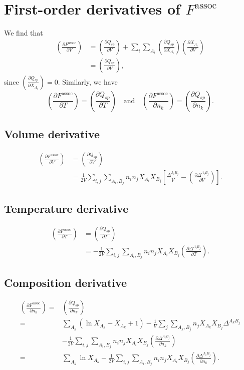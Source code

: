 \documentclass[10pt, a4paper]{article}
\newcommand*{\pder}[2]{\left(\frac{\partial #1}{\partial #2}\right)}
\newcommand{\lp}{\left(}
\newcommand{\rp}{\right)}
\begin{document}
\section{First-order derivatives of $F^{\text{assoc}}$} \label{first-order derivatives}
We find that
\begin{align*}
\pder{F^{\text{assoc}}}{V} &= \pder{Q_{sp}}{V}  + \sum_i \sum_{A_i} \pder{Q_{sp}}{X_{A_i}} \pder{X_{A_i}}{V} \\
& = \pder{Q_{sp}}{V},
\end{align*}
since $\pder{Q_{sp}}{X_{A_i}} = 0$. Similarly, we have
$$
\pder{F^{\text{assoc}}}{T} = \pder{Q_{sp}}{T} \quad \text{and} \quad \pder{F^{\text{assoc}}}{n_k} = \pder{Q_{sp}}{n_k}.
$$
\subsection{Volume derivative}
\begin{align}
  \pder{F^{\text{assoc}}}{V} &= \pder{Q_{sp}}{V} \\ \nonumber
  &= \frac{1}{2V} \sum_{i,j} \sum_{A_i, B_j} n_i n_j X_{A_i} X_{B_j} \left[ \frac{\Delta^{A_i B_j}}{V} - \pder{\Delta^{A_i B_j}}{V} \right].
\end{align}

\subsection{Temperature derivative}
\begin{align}
  \pder{F^{\text{assoc}}}{T} &= \pder{Q_{sp}}{T} \\ \nonumber
  &= -\frac{1}{2V} \sum_{i,j} \sum_{A_i, B_j} n_i n_j X_{A_i} X_{B_j} \pder{\Delta^{A_i B_j}}{T}.
\end{align}

\subsection{Composition derivative}
\begin{align}
  \pder{F^{\text{assoc}}}{n_k} =& \pder{Q_{sp}}{n_k} \nonumber \\ 
  =& \sum_{A_k} \lp \ln X_{A_k} - X_{A_k} + 1\rp - \frac{1}{V} \sum_{j} \sum_{A_k,B_j} n_j X_{A_k} X_{B_j} \Delta^{A_k B_j} \label{l1}\\
  &- \frac{1}{2V} \sum_{i,j} \sum_{A_i, B_j} n_i n_j X_{A_i} X_{B_j} \pder{\Delta^{A_i B_j}}{n_k} \label{l2}\\
  =& \sum_{A_k} \ln X_{A_k} - \frac{1}{2V} \sum_{i,j} \sum_{A_i, B_j} n_i n_j X_{A_i} X_{B_j} \pder{\Delta^{A_i B_j}}{n_k}. \label{nono}
\end{align}
\end{document}
